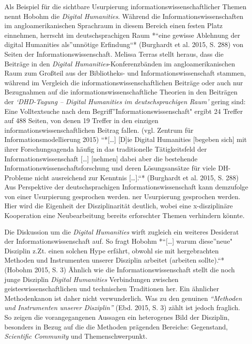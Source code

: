 \documentclass[a4paper,
fontsize=11pt,
oneside,
numbers=noperiodatend,
parskip=half-,
bibliography=totoc,
final
]{scrartcl}
\begin{document}
Als Beispiel für die sichtbare Usurpierung
informationswissenschaftlicher Themen nennt Hobohm die \emph{Digital
Humanities}. Während die Informationswissenschaften im
angloamerikanischen Sprachraum in diesem Bereich einen festen Platz
einnehmen, herrscht im deutschsprachigen Raum *\enquote{eine gewisse
Ablehnung der digital Humanities als}unnötige Erfindung\enquote{*
(Burghardt et al. 2015, S. 288) von Seiten der Informationswissenschaft.
Melissa Terras stellt heraus, dass die Beiträge in den \emph{Digital
Humanities}-Konferenzbänden im angloamerikanischen Raum zum Großteil aus
der Bibliotheks- und Informationswissenschaft stammen, während im
Vergleich die informationswissenschaftlichen Beiträge oder auch nur
Bezugnahmen auf die informationswissenschaftliche Theorien in den
Beiträgen der \emph{\enquote{DHD-Tagung -- Digital Humanities im
deutschsprachigen Raum}} gering sind: Eine Volltextsuche nach dem
Begriff}Informationswissenschaft" ergibt 24 Treffer auf 488 Seiten, von
denen 19 Treffer in den einzigen informationswissenschaftlichen Beitrag
fallen. (vgl. Zentrum für Informationsmodellierung 2015)
``*{[}\ldots{}{]} {[}D{]}ie Digital Humanities {[}begeben sich{]} mit
ihrer Forschungsagenda häufig in das traditionelle Tätigkeitsfeld der
Informationswissenschaft {[}\ldots{}{]} {[}nehmen{]} dabei aber die
bestehende Informationswissenschaftsforschung und deren Lösungsansätze
für viele DH-Probleme nicht ausreichend zur Kenntnis {[}\ldots{}{]}.``*
(Burghardt et al. 2015, S. 288) Aus Perspektive der deutschsprachigen
Informationswissenschaft kann demzufolge von einer Usurpierung
gesprochen werden. ner Usurpierung gesprochen werden. Hier wird die
Eigenheit der Disziplinarität deutlich, wobei eine x-disziplinäre
Kooperation eine Neubearbeitung bereits erforschter Themen verhindern
könnte.

Die Diskussion um die \emph{Digital Humanities} wirft zugleich ein
weiteres Desiderat der Informationswissenschaft auf. So fragt Hobohm
*\enquote{{[}\ldots{}{]} warum diese}neue" Disziplin z.Zt. einen solchen
Hype erfährt, obwohl sie mit hergebrachten Methoden und Instrumenten
unserer Disziplin arbeitet (arbeiten sollte).``* (Hobohm 2015, S. 3)
Ähnlich wie die Informationswissenschaft stellt die noch junge Disziplin
\emph{Digital Humanities} Verbindungen zwischen
geisteswissenschaftlichen und technischen Traditionen her. Ein ähnlicher
Methodenkanon ist daher nicht verwunderlich. Was zu den genuinen
\emph{\enquote{Methoden und Instrumenten unserer Disziplin}} (Ebd. 2015,
S. 3) zählt ist jedoch fraglich. So zeigen die vorangegangenen Aussagen
ein heterogenes Bild der Disziplin, besonders in Bezug auf die die
Methoden prägenden Bereiche: Gegenstand, \emph{Scientific Community} und
Themenschwerpunkt.
\end{document}

